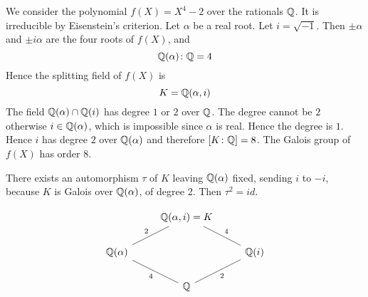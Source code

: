 \begin{example}[]
    We consider the polynomial $f(X) = X^4 - 2$ over the rationals  $\mathbb{Q}$. It is irreducible by Eisenstein's criterion. Let $\alpha$ be a real root. Let $i=\sqrt{-1}$. Then $\pm\alpha$ and $\pm i\alpha$ are the four roots of $f(X)$, and \[
    \mathbb{Q}(\alpha)\colon \mathbb{Q} = 4
\] 
Hence the splitting field of $f(X) $ is \[
    K=\mathbb{Q}(\alpha,i)
\]
The field $\mathbb{Q}(\alpha)\cap\mathbb{Q}(i)$ has degree $1$ or $2$ over $\mathbb{Q}$. 
The degree cannot be $2$ otherwise $i\in \mathbb{Q}(\alpha)$, which is impossible since $\alpha$ is real. Hence the degree is $1$. Hence $i$ has degree $2$ over $\mathbb{Q}(\alpha)$ and therefore $[K\colon \mathbb{Q}]=8$.
The Galois group of $f(X)$ has order $8$.

There exists an automorphism $\tau$ of $K$ leaving $\mathbb{Q}(\alpha)$ fixed, sending $i$ to $-i$, because $K$ is Galois over $\mathbb{Q}(\alpha)$, of degree 2.
Then $\tau^2 = id$.

\begin{equation*}
\begin{tikzcd}
   & \Q(\alpha,i) = K \ar[dr, dash, "4"]&\\
    \Q(\alpha) \arrow[ur, dash, "2"] &  & \Q(i) \ar[dl, dash, "2"]\\
    & \Q \ar[ul, dash, "4"]  &
\end{tikzcd}
\end{equation*}

\end{example}
